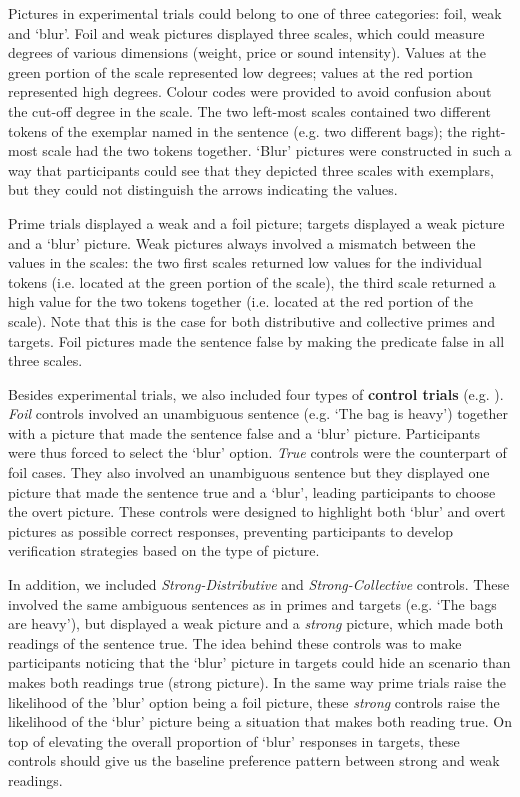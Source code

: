 \documentclass[a4paper, 11pt]{article}
\newcommand{\nbMM}[1]{{\leavevmode\color{red}{\scriptsize#1}}}
\begin{document}
Pictures in experimental trials could belong to one of three categories: foil, weak and `blur'.  
Foil and weak pictures displayed three scales, which could measure degrees of various dimensions (weight, price or sound intensity). \nbMM{How much detail should I provide here?}
Values at the green portion of the scale represented low degrees; values at the red portion represented high degrees. Colour codes were provided to avoid confusion about the cut-off degree in the scale. 
The two left-most scales contained two different tokens of the exemplar named in the sentence (e.g. two different bags); the right-most scale had the two tokens together. 
`Blur' pictures were constructed in such a way that participants could see that they depicted three scales with exemplars, but they could not distinguish the arrows indicating the values. 

Prime trials displayed a weak and a foil picture; targets displayed a weak picture and a `blur' picture.  Weak pictures always involved a mismatch between the values in the scales: the two first scales returned low values for the individual tokens (i.e. located at the green portion of the scale), the third scale returned a high value for the two tokens together (i.e. located at the red portion of the scale).  Note that this is the case for both distributive and collective primes and targets. Foil pictures made the sentence false by making the predicate false in all three scales. 

Besides experimental trials, we also included four types of \textbf{control trials} (e.g. ). \textit{Foil} controls involved an unambiguous sentence (e.g. `The bag is heavy') together with a picture that made the sentence false and a `blur' picture. Participants were thus forced to select the `blur' option. \emph{True} controls were the counterpart of foil cases. They also involved an unambiguous sentence but they displayed one picture that made the sentence true and a `blur', leading participants to choose the overt picture. 
These controls were designed to highlight both `blur' and overt pictures as possible correct responses, preventing participants to develop verification strategies based on the type of picture. 

In addition, we included \textit{Strong-Distributive} and \textit{Strong-Collective} controls. These involved the same ambiguous sentences as in primes and targets (e.g. `The bags are heavy'), but displayed a weak picture and a \emph{strong} picture, which made both readings of the sentence true. The idea behind these controls was to make participants noticing that the `blur' picture in targets could hide an scenario than makes both readings true (strong picture). In the same way prime trials raise the likelihood of the 'blur' option being a foil picture, these \textit{strong} controls raise the likelihood of the `blur' picture being a situation that makes both reading true. On top of elevating the overall proportion  of `blur' responses in targets, these controls should give us the baseline preference pattern between strong and weak readings. 
\end{document}
